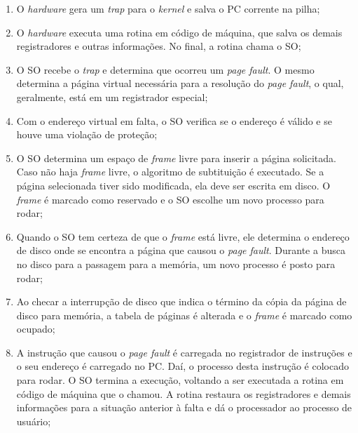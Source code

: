 \begin{enumerate}
  \item O \textit{hardware} gera um \textit{trap} para o \textit{kernel} e salva o PC corrente na pilha;

  \item O \textit{hardware} executa uma rotina em código de máquina, que salva os demais registradores e outras informações. No final, a rotina chama o SO;

  \item O SO recebe o \textit{trap} e determina que ocorreu um \textit{page fault}. O mesmo determina a página virtual necessária para a resolução do \textit{page fault}, o qual, geralmente, está em um registrador especial;

  \item Com o endereço virtual em falta, o SO verifica se o endereço é válido e se houve uma violação de proteção;

  \item O SO determina um espaço de \textit{frame} livre para inserir a página solicitada. Caso não haja \textit{frame} livre, o algoritmo de subtituição é executado. Se a página selecionada tiver sido modificada, ela deve ser escrita em disco. O \textit{frame} é marcado como reservado e o SO escolhe um novo processo para rodar;

  \item Quando o SO tem certeza de que o \textit{frame} está livre, ele determina o endereço de disco onde se encontra a página que causou o \textit{page fault}. Durante a busca no disco para a passagem para a memória, um novo processo é posto para rodar;

  \item Ao checar a interrupção de disco que indica o término da cópia da página de disco para memória, a tabela de páginas é alterada e o \textit{frame} é marcado como ocupado;

  \item A instrução que causou o \textit{page fault} é carregada no registrador de instruções e o seu endereço é carregado no PC. Daí, o processo desta instrução é colocado para rodar. O SO termina a execução, voltando a ser executada a rotina em código de máquina que o chamou. A rotina restaura os registradores e demais informações para a situação anterior à falta e dá o processador ao processo de usuário;

\end{enumerate}








